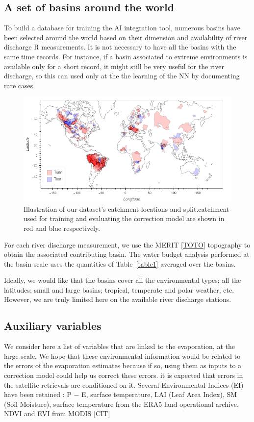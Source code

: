 \documentclass[draft]{agujournal2019}
\begin{document}
\subsection{A set of basins around the world}
\label{def_basins}
To build a database for training the AI integration tool, numerous basins have been selected around the world based on their dimension and availability of river discharge R measurements. It is not necessary to have all the basins with the same time records. For instance, if a basin associated to extreme environments is available only for a short record, it might still be very useful for the river discharge, so this can used only at the the learning of the NN by documenting rare cases. 


\begin{figure}[h]
\centering
\includegraphics[width=\textwidth]{figure1}
\caption{Illustration of our dataset's catchment locations and split.catchment used for training and evaluating the correction model are shown in red and blue respectively.}
\end{figure}





For each river discharge measurement, we use the MERIT \ref{TOTO} topography to obtain the associated contributing basin. The water budget analysis performed at the basin scale uses the quantities of Table~\ref{table1} averaged over the basins.

Ideally, we would like that the basins cover all the environmental types; all the latitudes; small and large basins; tropical, temperate and polar weather; etc. However, we are truly limited here on the available river discharge stations. 

\subsection{Auxiliary variables}
\label{auxiliary_info}
We consider here a list of variables that are linked to the evaporation, at the large scale. We hope that these environmental information would be related to the errors of the evaporation estimates because if so, using them as inputs to a correction model could help us correct these errors. it is expected that errors in the satellite retrievals are conditioned on it.  Several Environmental Indices (EI) have been retained : P − E, surface temperature, LAI (Leaf Area Index), SM (Soil Moisture), surface temperature from the ERA5 land operational archive, NDVI and EVI from MODIS [CIT]
\end{document}
